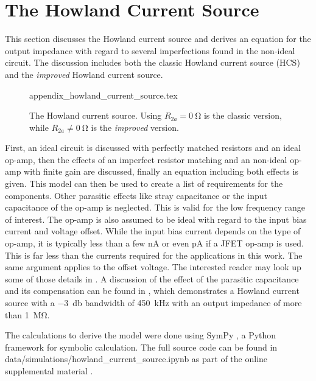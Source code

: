\documentclass[12pt]{book}
\providecommand{\external}[1]{\textsf{#1}}
\begin{document}
\section{The Howland Current Source}
\label{sec:appendix_howland_current_source}
This section discusses the Howland current source and derives an equation for the output impedance with regard to several imperfections found in the non-ideal circuit. The discussion includes both the classic Howland current source (HCS) \cite{howland_current_source} and the \textit{improved} Howland current source.
\begin{figure}[ht]
    \centering
    {appendix_howland_current_source.tex}
    \caption{The Howland current source. Using $R_{2a} = \qty{0}{\ohm}$ is the classic version, while $R_{2a} \neq \qty{0}{\ohm}$ is the \textit{improved} version.}
    \label{fig:appendix_howland_current_source}
\end{figure}

First, an ideal circuit is discussed with perfectly matched resistors and an ideal op-amp, then the effects of an imperfect resistor matching and an non-ideal op-amp with finite gain are discussed, finally an equation including both effects is  given. This model can then be used to create a list of requirements for the components. Other parasitic effects like stray capacitance or the input capacitance of the op-amp is neglected. This is valid for the low frequency range of interest. The op-amp is also assumed to be ideal with regard to the input bias current and voltage offset. While the input bias current depends on the type of op-amp, it is typically less than a few \unit{\nA} or even \unit{\pA} if a JFET op-amp is used. This is far less than the currents required for the applications in this work. The same argument applies to the offset voltage. The interested reader may look up some of those details in \cite{howland_comprehensive}. A discussion of the effect of the parasitic capacitance and its compensation can be found in \cite{howland_current_source_compensation}, which demonstrates a Howland current source with a \qty{-3}{\decibel} bandwidth of \qty{450}{\kHz} with an output impedance of more than \qty{1}{\mega\ohm}.

The calculations to derive the model were done using SymPy \cite{sympy}, a Python framework for symbolic calculation. The full source code can be found in \external{data/simulations/howland\_current\_source.ipynb} as part of the online supplemental material \cite{supplemental_material}.
\end{document}
